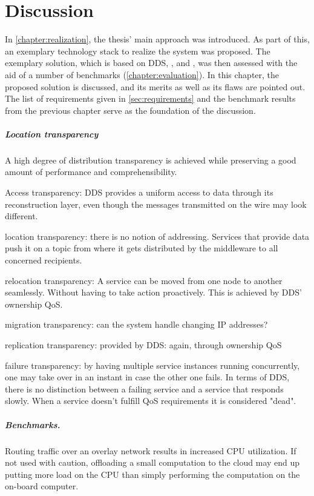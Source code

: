 \chapter{Discussion}\label{chapter:discussion}
In \autoref{chapter:realization}, the thesis' main approach was introduced. As part of this, an exemplary technology stack to realize the system was proposed. The exemplary solution, which is based on DDS, \docker , and \wnet , was then assessed with the aid of a number of benchmarks (\cf \autoref{chapter:evaluation}). In this chapter, the proposed solution is discussed, and its merits as well as its flaws are pointed out. The list of requirements given in \autoref{sec:requirements} and the benchmark results from the previous chapter serve as the foundation of the discussion. 

\paragraph{Location transparency}
A high degree of distribution transparency is achieved while preserving a good amount of performance and comprehensibility.

Access transparency: DDS provides a uniform access to data through its reconstruction layer, even though the messages transmitted on the wire may look different.

location transparency: there is no notion of addressing. Services that provide data push it on a topic from where it gets distributed by the middleware to all concerned recipients.

relocation transparency: A service can be moved from one node to another seamlessly. Without having to take action proactively. This is achieved by DDS' ownership QoS.

migration transparency: can the system handle changing IP addresses?

replication transparency: provided by DDS: again, through ownership QoS

failure transparency: by having multiple service instances running concurrently, one may take over in an instant in case the other one fails. In terms of DDS, there is no distinction between a failing service and a service that responds slowly. When a service doesn't fulfill QoS requirements it is considered "dead".

\paragraph{Benchmarks.}
Routing traffic over an overlay network results in increased CPU utilization. If not used with caution, offloading a small computation to the cloud may end up putting more load on the CPU than simply performing the computation on the on-board computer.

